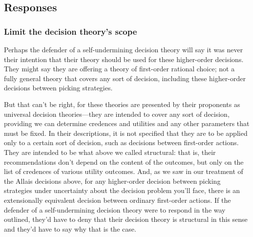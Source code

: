 \documentclass[a4paper]{article}
\newcommand{\todoold}[2][]{\todo[backgroundcolor=white,bordercolor=orange!10,linecolor=gray!10, #1,caption={},textcolor=gray]{Pre-rev: #2}}
\newcommand{\todooldinfo}[2][]{\todoold[#1]{#2}}
\newenvironment{CCM rewritten}
{\begingroup\color{blue}} %
{\endgroup}              %
\begin{document}


\subsection{Responses}

\subsubsection{Limit the decision theory's scope}

	Perhaps the defender of a self-undermining decision theory will say it was never their intention that their theory should be used for these higher-order decisions. They might say they are offering a theory of first-order rational choice; not a fully general theory that covers any sort of decision, including these higher-order decisions between picking strategies. 
	
But that can't be right, for these theories are presented by their proponents as universal decision theories---they are intended to cover any sort of decision, providing we can determine credences and utilities and any other parameters that must be fixed. In their descriptions, it is not specified that they are to be applied only to a certain sort of decision, such as decisions between first-order actions. They are intended to be what above we called structural: that is, their recommendations don't depend on the content of the outcomes, but only on the list of credences of various utility outcomes. And, as we saw in our treatment of the Allais decisions above, for any higher-order decision between picking strategies under uncertainty about the decision problem you'll face, there is an extensionally equivalent decision between ordinary first-order actions. If the defender of a self-undermining decision theory were to respond in the way outlined, they'd have to deny that their decision theory is structural in this sense and they'd have to say why that is the case.
	
\end{document}
